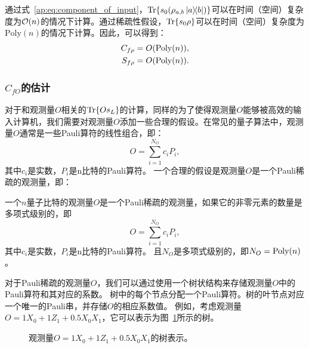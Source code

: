 通过式~\eqref{ap:eq:component_of_input}，$\Tr{s_0  (\rho_{a,b}\ketbra{a}{b})}$可以在时间（空间）复杂度为$\order{n}$的情况下计算。通过稀疏性假设，$\Tr{s_0 \rho}$可以在时间（空间）复杂度为$\mathrm{Poly}(n)$的情况下计算。因此，可以得到：
\begin{equation}\label{eq:cost_rho}
    \begin{aligned}
        C_{f\rho}&=O(\text{Poly}(n)),\\
        S_{f\rho}&=O(\text{Poly}(n)).
    \end{aligned}
\end{equation}
 



\subsubsection{$C_{fO}$的估计}
对于和观测量$O$相关的$\Tr{Os_L}$的计算，同样的为了使得观测量$O$能够被高效的输入计算机，我们需要对观测量$O$添加一些合理的假设。在常见的量子算法中，观测量$O$通常是一些Pauli算符的线性组合，即：
\begin{equation}
    O = \sum_{i=1}^{N_O} c_i P_i,
\end{equation}
其中$c_i$是实数，$P_i$是n比特的Pauli算符。
一个合理的假设是观测量$O$是一个Pauli稀疏的观测量，即：
\begin{definition}\label{def:sparse_observable}
    一个$n$量子比特的观测量$O$是一个Pauli稀疏的观测量，如果它的非零元素的数量是多项式级别的，即
    \begin{equation}
        O=\sum_{i=1}^{N_O} c_i P_i,
    \end{equation}
    其中$c_i$是实数，$P_i$是n比特的Pauli算符。
    且$N_O$是多项式级别的，即$N_O=\text{Poly}(n)$。
\end{definition}
对于Pauli稀疏的观测量$O$，我们可以通过使用一个树状结构来存储观测量$O$中的Pauli算符和其对应的系数。
树中的每个节点分配一个Pauli算符。树的叶节点对应一个唯一的Pauli串，并存储$O$的相应系数值。
例如，考虑观测量$O=1 X_0+1 Z_1+0.5 X_0X_1$，它可以表示为图~\ref{fig:trie}所示的树。

\begin{figure}[htbp]
    \centering
{}
\caption{观测量$O=1 X_0+1 Z_1+0.5 X_0X_1$的树表示。}\label{fig:trie}
\end{figure}

